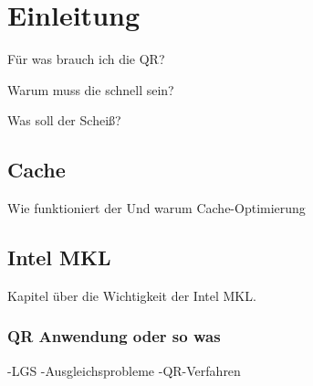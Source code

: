 \chapter{Einleitung}

Für was brauch ich die QR?

Warum muss die schnell sein?

Was soll der Scheiß?

\section{Cache}
Wie funktioniert der
Und warum Cache-Optimierung

\section{Intel MKL}

Kapitel über die Wichtigkeit der Intel MKL.

\subsection{QR Anwendung oder so was}
-LGS 
-Ausgleichsprobleme 
-QR-Verfahren 
